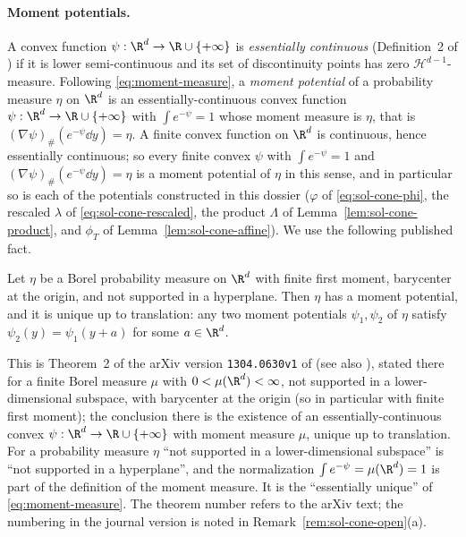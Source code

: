 \documentclass[../main.tex]{subfiles}
\begin{document}
\paragraph{Moment potentials.}
A convex function $\psi:\R^d\to\R\cup\{+\infty\}$ is \emph{essentially continuous}
(Definition~2 of \cite{CorderoErausquinKlartag2015MomentMeasures}) if it is lower
semi-continuous and its set of discontinuity points has zero $\mathcal H^{d-1}$-measure.
Following \eqref{eq:moment-measure}, a \emph{moment potential} of a probability measure $\eta$
on $\R^d$ is an essentially-continuous convex function $\psi:\R^d\to\R\cup\{+\infty\}$ with
$\int e^{-\psi}=1$ whose moment measure is $\eta$, that is
$(\nabla\psi)_\#(e^{-\psi}\dd y)=\eta$.  A finite convex function on $\R^d$ is continuous,
hence essentially continuous; so every finite convex $\psi$ with $\int e^{-\psi}=1$ and
$(\nabla\psi)_\#(e^{-\psi}\dd y)=\eta$ is a moment potential of $\eta$ in this sense, and in
particular so is each of the potentials constructed in this dossier ($\varphi$ of
\eqref{eq:sol-cone-phi}, the rescaled $\lambda$ of \eqref{eq:sol-cone-rescaled}, the product
$\Lambda$ of Lemma~\ref{lem:sol-cone-product}, and $\phi_T$ of Lemma~\ref{lem:sol-cone-affine}).
We use the following published fact.

\begin{theorem}
\label{thm:sol-cone-cek}
Let $\eta$ be a Borel probability measure on $\R^d$ with finite first moment, barycenter at
the origin, and not supported in a hyperplane.  Then $\eta$ has a moment potential, and it is
unique up to translation: any two moment potentials $\psi_1,\psi_2$ of $\eta$ satisfy
$\psi_2(y)=\psi_1(y+a)$ for some $a\in\R^d$.
\end{theorem}

This is Theorem~2 of the arXiv version \texttt{1304.0630v1} of
\cite{CorderoErausquinKlartag2015MomentMeasures} (see also \cite{Klartag2013MomentMeasures}),
stated there for a finite Borel measure $\mu$ with $0<\mu(\R^d)<\infty$, not supported in a
lower-dimensional subspace, with barycenter at the origin (so in particular with finite first
moment); the conclusion there is the existence of an essentially-continuous convex
$\psi:\R^d\to\R\cup\{+\infty\}$ with moment measure $\mu$, unique up to translation.  For a
probability measure $\eta$ ``not supported in a lower-dimensional subspace'' is ``not
supported in a hyperplane'', and the normalization $\int e^{-\psi}=\mu(\R^d)=1$ is part of the
definition of the moment measure.  It is the ``essentially unique'' of \eqref{eq:moment-measure}.
The theorem number refers to the arXiv text; the numbering in the journal version is noted in
Remark~\ref{rem:sol-cone-open}(a).
\end{document}
